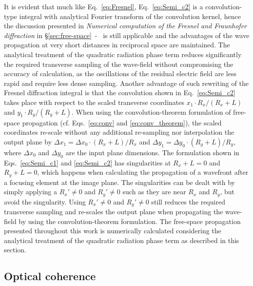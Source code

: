\begin{refsection}
It is evident that much like Eq.~\ref{eq:Fresnel}, Eq.~\ref{eq:Semi_c2} is a convolution-type integral with analytical Fourier transform of the convolution kernel, hence the discussion presented in \textit{Numerical computation of the Fresnel and Fraunhofer diffraction} in \S\ref{sec:free-space}~-~\textit{} is still applicable and the advantages of the wave propagation at very short distances in reciprocal space are maintained. The analytical treatment of the quadratic radiation phase term reduces significantly the required transverse sampling of the wave-field without compromising the accuracy of calculation, as the oscillations of the residual electric field are less rapid and require less dense sampling. Another advantage of such rewriting of the Fresnel diffraction integral is that the convolution shown in Eq.~\ref{eq:Semi_c2} takes place with respect to the scaled transverse coordinates $x_1\cdot R_x/(R_x+L)$ and $y_1\cdot R_y/(R_y+L)$. When using the convolution-theorem formulation of free-space propagation (cf. Eqs.~\ref{eq:conv} and \ref{eq:conv_theorem}), the scaled coordinates re-scale without any additional re-sampling nor interpolation the output plane by $\Delta x_1 = \Delta x_0 \cdot (R_x+L)/R_x$ and  $\Delta y_1 = \Delta y_0 \cdot (R_y+L)/R_y$, where $\Delta x_0$ and $\Delta y_0$ are the input plane dimensions. The formulation shown in Eqs.~\ref{eq:Semi_c1} and \ref{eq:Semi_c2} has singularities at $R_x+L = 0$ and $R_y+L = 0$, which happens when calculating the propagation of a wavefront after a focusing element at the image plane. The singularities can be dealt with by simply applying a $R_x'\neq0$ and $R_y'\neq0$ such as they are near $R_x$ and $R_y$, but avoid the singularity. Using  $R_x'\neq0$ and $R_y'\neq0$ still reduces the required transverse sampling and re-scales the output plane when propagating the wave-field by using the convolution-theorem formulation. The free-space propagation presented throughout this work is numerically calculated considering the analytical treatment of the quadratic radiation phase term as described in this section.
\subsection{Optical coherence}\label{sec:optical_coherence}


\end{refsection}
